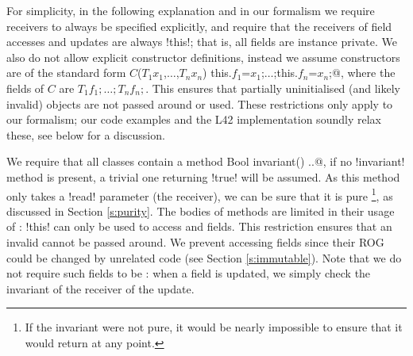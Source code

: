 For simplicity, in the following explanation and in our formalism
we require 
receivers to always be specified explicitly, and require that the receivers of field accesses and updates are always \Q!this!; that is, all fields are instance private.
We also do not allow explicit constructor definitions, instead we assume constructors are of the standard form \Q@$C$($T_1 x_1$,$\ldots$,$T_n x_n$) {this.$f_1$=$x_1$;$\ldots$;this.$f_n$=$x_n$;}@, where the fields of $C$ are $T_1 f_1;\ldots; T_n f_n;$. This ensures that partially uninitialised (and likely invalid) objects are not passed around or used. 
These restrictions only apply to our formalism; our code examples and the L42 implementation soundly relax these, see below for a discussion.%

We require that all classes contain a \Q@read method Bool invariant() {..}@, if no \Q!invariant! method is present, a trivial one returning \Q!true! will be assumed. As this method only takes a \Q!read! parameter (the receiver), we can be sure that it is pure \footnote{If the invariant were not pure, it would be nearly impossible to ensure that it would return \Q@true@ at any point.}, as discussed in Section \ref{s:purity}.
The bodies of \Q@invariant@ methods are limited in their usage of \Q@this@: \Q!this! can only be used to access \Q@imm@ and \Q@capsule@ fields. This restriction ensures that 
an invalid \Q@this@ cannot be passed around.
We prevent accessing \Q@mut@ fields since their ROG could be changed by unrelated code (see Section \ref{s:immutable}).
Note that we do not require such fields to be \Q@final@: when a field is updated, we simply check the invariant of the receiver of the update.

